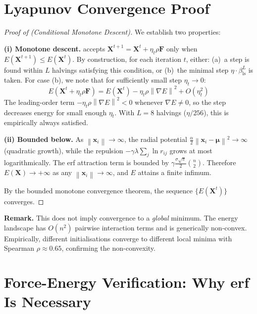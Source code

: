 \documentclass{article}
\newcommand{\norm}[1]{\left\lVert#1\right\rVert}
\begin{document}
\section{Lyapunov Convergence Proof}
\label{app:lyapunov_proof}

\begin{proof}[Proof of  (Conditional Monotone Descent)]
We establish two properties:

\textbf{(i) Monotone descent.}  accepts $\mathbf{X}^{t+1} = \mathbf{X}^t + \eta_t \rho \mathbf{F}$ only when $E(\mathbf{X}^{t+1}) \leq E(\mathbf{X}^t)$. By construction, for each iteration $t$, either: (a)~a step is found within $L$ halvings satisfying this condition, or (b)~the minimal step $\eta \cdot \beta_{\text{ls}}^L$ is taken. For case (b), we note that for sufficiently small step $\eta_t \to 0$:
\begin{equation}
E(\mathbf{X}^t + \eta_t \rho \mathbf{F}) = E(\mathbf{X}^t) - \eta_t \rho \norm{\nabla E}^2 + O(\eta_t^2)
\end{equation}
The leading-order term $-\eta_t \rho \norm{\nabla E}^2 < 0$ whenever $\nabla E \neq 0$, so the step decreases energy for small enough $\eta_t$. With $L = 8$ halvings ($\eta/256$), this is empirically always satisfied.

\textbf{(ii) Bounded below.} As $\norm{\mathbf{x}_i} \to \infty$, the radial potential $\frac{\alpha}{2}\norm{\mathbf{x}_i - \bm{\mu}}^2 \to \infty$ (quadratic growth), while the repulsion $-\gamma\lambda\sum_{j} \ln r_{ij}$ grows at most logarithmically. The erf attraction term is bounded by $\gamma\frac{\sigma\sqrt{\pi}}{2}\binom{n}{2}$. Therefore $E(\mathbf{X}) \to +\infty$ as any $\norm{\mathbf{x}_i} \to \infty$, and $E$ attains a finite infimum.

By the bounded monotone convergence theorem, the sequence $\{E(\mathbf{X}^t)\}$ converges.
\end{proof}

\textbf{Remark.} This does not imply convergence to a \emph{global} minimum. The energy landscape has $O(n^2)$ pairwise interaction terms and is generically non-convex. Empirically, different initialisations converge to different local minima with Spearman $\rho \approx 0.65$, confirming the non-convexity.

\section{Force-Energy Verification: Why erf Is Necessary}
\label{app:erf}
\end{document}

